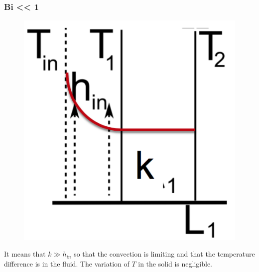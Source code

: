  			\subsubsection{Bi << 1}
	 			\begin{figure}
 				\vspace{-5mm}
 				\includegraphics[scale=0.35]{ch3/8}
 				\end{figure}
 			It means that $k \gg h_{in}$ so that the convection is limiting and that the temperature difference is in the fluid. The variation of $T$ in the solid is negligible.\\\\
 			
